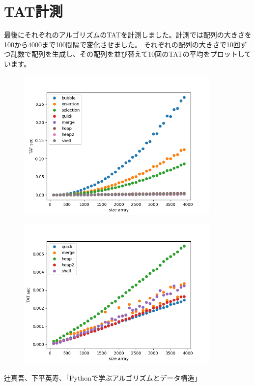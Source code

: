 \documentclass[dvipdfmx,pic,eepic,ecltree]{jarticle}
\begin{document}
\section{TAT計測}
 最後にそれぞれのアルゴリズムのTATを計測しました。計測では配列の大きさを100から4000まで100間隔で変化させました。
 それぞれの配列の大きさで10回ずつ乱数で配列を生成し、その配列を並び替えて10回のTATの平均をプロットしています。
 \begin{figure}[h]
 \begin{center}
\includegraphics[width=100mm]{time_measure.png}
\end{center}
\end{figure}
 \begin{figure}[h]
 \begin{center}
\includegraphics[width=100mm]{time_measure2.png}
\end{center}
\end{figure}
\begin{thebibliography}{9}
\item 辻真吾、下平英寿、「Pythonで学ぶアルゴリズムとデータ構造」
\end{thebibliography}
\end{document}
